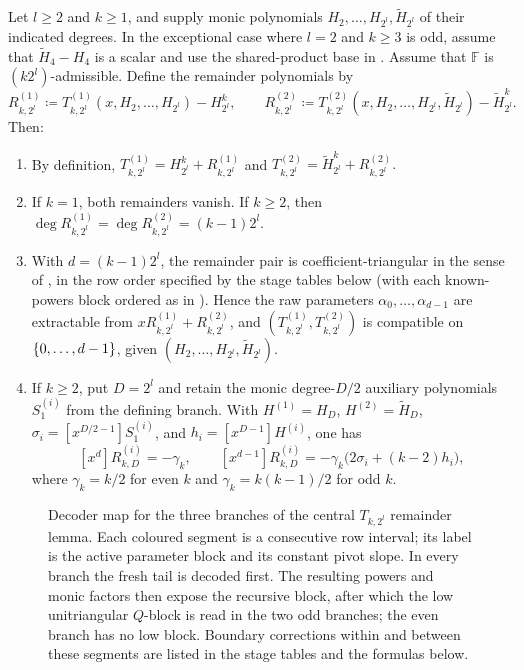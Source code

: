 \begin{lemma}\label{lem:Rk2l}
    Let $l\ge 2$ and $k\ge 1$, and supply monic polynomials
    $H_2,\ldots,H_{2^l},\tilde H_{2^l}$ of their indicated degrees.  In the
    exceptional case where $l=2$ and $k\ge3$ is odd, assume that
    $\tilde H_4-H_4$ is a scalar and use the shared-product base in
    .
    Assume that $\mathbb F$ is $(k2^l)$-admissible.
    Define the remainder polynomials by
    \[
      R^{(1)}_{k,2^l}\coloneqq T^{(1)}_{k,2^l}(x,H_2,\ldots,H_{2^l})-H_{2^l}^k,
      \qquad
      R^{(2)}_{k,2^l}\coloneqq T^{(2)}_{k,2^l}(x,H_2,\ldots,H_{2^l},\tilde H_{2^l})-\tilde H_{2^l}^k.
    \]
    Then:
    \begin{enumerate}
        \item By definition,
        \(
          T^{(1)}_{k,2^l}=H_{2^l}^k+R^{(1)}_{k,2^l}
        \)
        and
        \(
          T^{(2)}_{k,2^l}=\tilde H_{2^l}^k+R^{(2)}_{k,2^l}.
        \)
        \item If $k=1$, both remainders vanish.  If $k\ge2$, then
        $\deg R^{(1)}_{k,2^l}=\deg R^{(2)}_{k,2^l}=(k-1)2^l$.
        \item With $d=(k-1)2^l$, the remainder pair is
        coefficient-triangular in the sense of
        , in the row order specified by
        the stage tables below (with each known-powers block ordered as in
        ).  Hence the raw parameters
        $\alpha_0,\ldots,\alpha_{d-1}$ are extractable from
        $xR^{(1)}_{k,2^l}+R^{(2)}_{k,2^l}$, and
        $(T^{(1)}_{k,2^l},T^{(2)}_{k,2^l})$ is compatible on $\{0,\dotsc,d-1\}$,
        given $(H_2,\ldots,H_{2^l},\tilde H_{2^l})$.
        \item If $k\ge2$, put $D=2^l$ and retain the monic
        degree-$D/2$ auxiliary polynomials $S^{(i)}_1$ from the defining
        branch.  With $H^{(1)}=H_D$, $H^{(2)}=\widetilde H_D$,
        $\sigma_i=[x^{D/2-1}]S^{(i)}_1$, and
        $h_i=[x^{D-1}]H^{(i)}$, one has
        \[
          [x^d]R^{(i)}_{k,D}=-\gamma_k,
          \qquad
          [x^{d-1}]R^{(i)}_{k,D}
            =-\gamma_k\bigl(2\sigma_i+(k-2)h_i\bigr),
        \]
        where
        $\gamma_k=k/2$ for even $k$ and
        $\gamma_k=k(k-1)/2$ for odd $k$.
    \end{enumerate}
\end{lemma}
\begin{figure}[H]
  \centering
  \resizebox{\textwidth}{!}{}
  \caption{Decoder map for the three branches of the central
  $T_{k,2^l}$ remainder lemma.  Each coloured segment is a consecutive row
  interval; its label is the active parameter block and its constant pivot
  slope.  In every branch the fresh tail is decoded first.  The resulting
  powers and monic factors then expose the recursive block, after which the
  low unitriangular $Q$-block is read in the two odd branches; the even
  branch has no low block.  Boundary corrections within and between these
  segments are listed in the stage tables and the formulas below.}
  \label{fig:Rk2l-stages}
\end{figure}
